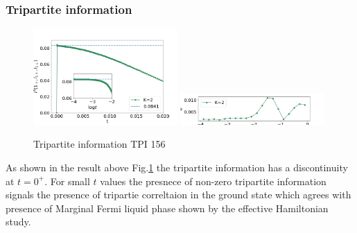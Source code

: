\documentclass[reprint,prb,superscriptaddress]{revtex4-2}
\begin{document}
\subsubsection{Tripartite information}

\begin{figure}
\includegraphics[width=0.49\textwidth]{plt/A_I3_ch2_[1,5,6]}
\includegraphics[width=0.49\textwidth]{plt/errorbar_A_I3_ch2_[1,5,6]}
\caption{Tripartite information TPI 156}
\label{fig:TPI_1_5_6}
\end{figure}
As shown in the result above Fig.\ref{fig:TPI_1_5_6} the tripartite information has a discontinuity at $t=0^+$. For small $t$ values the presnece of non-zero tripartite information signals the presence of tripartie correltaion in the ground state which agrees with presence of Marginal Fermi liquid phase shown by the effective Hamiltonian study.
\end{document}
